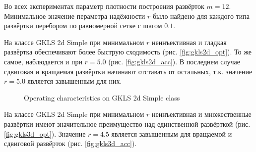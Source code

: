 \documentclass[runningheads]{llncs}
\begin{document}
Во всех экспериментах параметр плотности построения развёрток $m=12$. Минимальное значение пераметра надёжности \(r\) было найдено для каждого типа развёртки перебором по равномерной сетке с шагом \(0.1\).

На классе GKLS 2d Simple при минимальном \(r\) неинъективная и гладкая развёртка обеспечивают более быструю сходимость (рис. \ref{fig:gkls2d_opt}). То же самое, наблюдается и при \(r=5.0\) (рис. \ref{fig:gkls2d_acc}). В последнем случае сдвиговая и вращаемая развёртки начинают отставать от остальных, т.к. значение \(r=5.0\) является завышенным для них.
\begin{figure}[ht]
    \centering
    \caption{Operating characteristics on GKLS 2d Simple class}
\end{figure}

На классе GKLS 2d Simple при минимальном \(r\) неинъективная и множественные развёртки имеют значительное преимущество над единственной развёрткой (рис. \ref{fig:gkls3d_opt}). Значение \(r=4.5\) является завышенным для вращаемой и сдвиговой развёрток (рис. \ref{fig:gkls3d_acc}).
\end{document}
